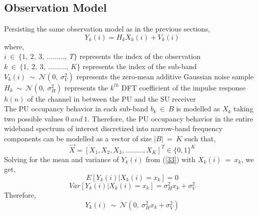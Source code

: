 \documentclass[12pt, draftcls, onecolumn]{IEEEtran}
\begin{document}
\subsection{Observation Model}
Persisting the same observation model as in the previous sections,
\begin{equation}\label{33}
    Y_k(i) = H_kX_k(i) + V_k(i)
\end{equation}
where,
\\$i\ \in\ \{1,\ 2,\ 3,\ .........,\ T\}$ represents the index of the observation
\\$k\ \in\ \{1,\ 2,\ 3,\ .........,\ K\}$ represents the index of the sub-band
\\$V_k(i)\ \sim\ \mathcal{N}(0,\ \sigma_V^2)$ represents the zero-mean additive Gaussian noise sample
\\$H_k\ \sim\ \mathcal{N}(0,\ \sigma_H^2)$ represents the $k^{th}$ DFT coefficient of the impulse response $h(n)$ of the channel in between the PU and the SU receiver
\\The PU occupancy behavior in each sub-band $b_k\ \in\ B$ is modelled as $X_k$ taking two possible values $0\ and\ 1$. Therefore, the PU occupancy behavior in the entire wideband spectrum of interest discretized into narrow-band frequency components can be modelled as a vector of size $|B|\ =\ K$ such that,
\begin{equation}\label{34}
    \vec{X} = [X_1, X_2, X_3, ........., X_K]^T \in \{0,1\}^K
\end{equation}
Solving for the mean and variance of $Y_k(i)$ from (\ref{33}) with $X_k(i)\ =\ x_k$, we get,
\begin{equation}\label{35}
    E[Y_k(i) | X_k(i) = x_k] = 0
\end{equation}
\begin{equation}\label{36}
    Var[Y_k(i) | X_k(i) = x_k] = \sigma_H^2x_k + \sigma_V^2
\end{equation}
Therefore,
\[Y_k(i)\ \sim\ \mathcal{N}(0,\ \sigma_H^2x_k + \sigma_V^2)\]
\end{document}
